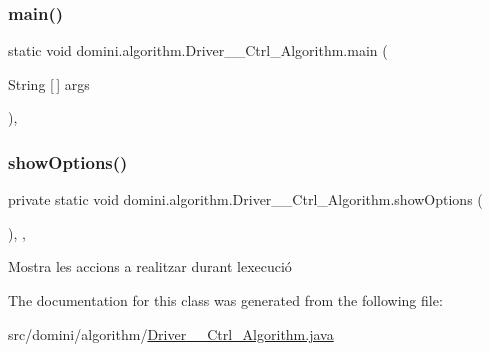 \subsubsection{\texorpdfstring{main()}{main()}}
{\footnotesize\ttfamily static void domini.\+algorithm.\+Driver\+\_\+\+\_\+\+Ctrl\+\_\+\+Algorithm.\+main (\begin{DoxyParamCaption}\item[{String \mbox{[}$\,$\mbox{]}}]{args }\end{DoxyParamCaption})\hspace{0.3cm}{\ttfamily [inline]}, {\ttfamily [static]}}

\mbox{\label{classdomini_1_1algorithm_1_1Driver____Ctrl__Algorithm_afad303731ad32c08c8dbffbf63b3fd9f}} 
\subsubsection{\texorpdfstring{show\+Options()}{showOptions()}}
{\footnotesize\ttfamily private static void domini.\+algorithm.\+Driver\+\_\+\+\_\+\+Ctrl\+\_\+\+Algorithm.\+show\+Options (\begin{DoxyParamCaption}{ }\end{DoxyParamCaption})\hspace{0.3cm}{\ttfamily [inline]}, {\ttfamily [static]}, {\ttfamily [private]}}



Mostra les accions a realitzar durant l\textquotesingle{}execució 



The documentation for this class was generated from the following file\+:\begin{DoxyCompactItemize}
\item 
src/domini/algorithm/\hyperlink{Driver____Ctrl__Algorithm_8java}{Driver\+\_\+\+\_\+\+Ctrl\+\_\+\+Algorithm.\+java}\end{DoxyCompactItemize}
